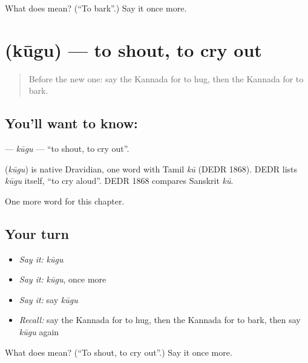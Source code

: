 \begin{tcolorbox}[breakable,colback=teal!4,colframe=teal!35!black,title={Before you move on}]
What does  mean? (\textquotedblleft{}To bark\textquotedblright{}.) Say it once more.
\end{tcolorbox}
\section[\texorpdfstring{\kn{ಕೂಗು} (kūgu)}{ಕೂಗು (kūgu)}]{ (kūgu) — to shout, to cry out}

\label{lesson:KA-C240-kugu}



\begin{quote}
Before the new one: say the Kannada for to hug, then the Kannada for to bark.
\end{quote}

\subsection*{You'll want to know: }
\textbf{} — \emph{kūgu} — \textquotedblleft{}to shout, to cry out\textquotedblright{}.

\begin{cousinweb}
\textbf{} (\emph{kūgu}) is native Dravidian, one word with Tamil \emph{kū} (DEDR 1868). DEDR lists \emph{kūgu} itself, \textquotedblleft{}to cry aloud\textquotedblright{}. DEDR 1868 compares Sanskrit \emph{kū}.
\end{cousinweb}

\begin{grammarlens}[title={What you've built}]
One more word for this chapter.
\end{grammarlens}

\subsection*{Your turn}
\begin{itemize}
\raggedright
  \item \emph{Say it:} \emph{kūgu}
  \item \emph{Say it:} \emph{kūgu}, once more
  \item \emph{Say it:} say \emph{kūgu}
  \item \emph{Recall:} say the Kannada for to hug, then the Kannada for to bark, then say \emph{kūgu} again
\end{itemize}

\begin{tcolorbox}[breakable,colback=teal!4,colframe=teal!35!black,title={Before you move on}]
What does  mean? (\textquotedblleft{}To shout, to cry out\textquotedblright{}.) Say it once more.
\end{tcolorbox}
